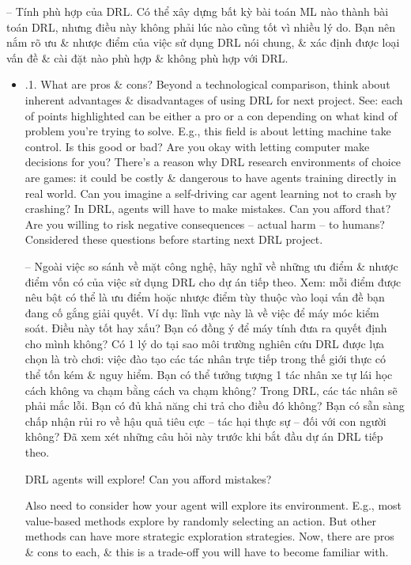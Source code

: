 \documentclass{article}
\begin{document}
\begin{itemize}
\begin{itemize}
        -- {\sf Tính phù hợp của DRL.} Có thể xây dựng bất kỳ bài toán ML nào thành bài toán DRL, nhưng điều này không phải lúc nào cũng tốt vì nhiều lý do. Bạn nên nắm rõ ưu \& nhược điểm của việc sử dụng DRL nói chung, \& xác định được loại vấn đề \& cài đặt nào phù hợp \& không phù hợp với DRL.
        \begin{itemize}
            \item {.1. What are pros \& cons?} Beyond a technological comparison, think about inherent advantages \& disadvantages of using DRL for next project. See: each of points highlighted can be either a pro or a con depending on what kind of problem you're trying to solve. E.g., this field is about letting machine take control. Is this good or bad? Are you okay with letting computer make decisions for you? There's a reason why DRL research environments of choice are games: it could be costly \& dangerous to have agents training directly in real world. Can you imagine a self-driving car agent learning not to crash by crashing? In DRL, agents will have to make mistakes. Can you afford that? Are you willing to risk negative consequences -- actual harm -- to humans? Considered these questions before starting next DRL project.

            -- Ngoài việc so sánh về mặt công nghệ, hãy nghĩ về những ưu điểm \& nhược điểm vốn có của việc sử dụng DRL cho dự án tiếp theo. Xem: mỗi điểm được nêu bật có thể là ưu điểm hoặc nhược điểm tùy thuộc vào loại vấn đề bạn đang cố gắng giải quyết. Ví dụ: lĩnh vực này là về việc để máy móc kiểm soát. Điều này tốt hay xấu? Bạn có đồng ý để máy tính đưa ra quyết định cho mình không? Có 1 lý do tại sao môi trường nghiên cứu DRL được lựa chọn là trò chơi: việc đào tạo các tác nhân trực tiếp trong thế giới thực có thể tốn kém \& nguy hiểm. Bạn có thể tưởng tượng 1 tác nhân xe tự lái học cách không va chạm bằng cách va chạm không? Trong DRL, các tác nhân sẽ phải mắc lỗi. Bạn có đủ khả năng chi trả cho điều đó không? Bạn có sẵn sàng chấp nhận rủi ro về hậu quả tiêu cực -- tác hại thực sự -- đối với con người không? Đã xem xét những câu hỏi này trước khi bắt đầu dự án DRL tiếp theo.

            {\sf DRL agents will explore! Can you afford mistakes?}

            Also need to consider how your agent will explore its environment. E.g., most value-based methods explore by randomly selecting an action. But other methods can have more strategic exploration strategies. Now, there are pros \& cons to each, \& this is a trade-off you will have to become familiar with.


\end{itemize}
\end{itemize}
\end{itemize}
\end{document}
